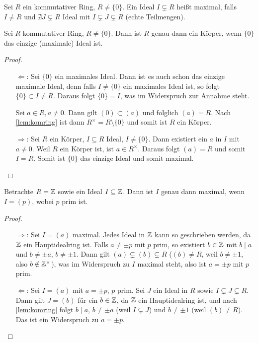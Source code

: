 \documentclass[12pt,a4paper]{scrartcl}
\begin{document}
\begin{defi}
	Sei $R$ ein kommutativer Ring, $R\neq \{0\}$. Ein Ideal $I\subsetneq R$ heißt maximal, falls $I\neq R$ und $\nexists J\subsetneq R$ Ideal mit $I\subsetneq J\subsetneq R$ (echte Teilmengen).
\end{defi}
\begin{lem} \label{lem:field_0_max_ideal}
	Sei $R$ kommutativer Ring, $R\neq \{0\}$. Dann ist $R$ genau dann ein Körper, wenn $\lbrace 0 \rbrace$ das einzige (maximale) Ideal ist.
\end{lem}
\begin{proof}
	\leavevmode
	\begin{itemize}
		\item[\glqq $\Leftarrow$\grqq:] Sei $\{0\}$ ein maximales Ideal. Dann ist es auch schon das einzige maximale Ideal, denn falls $I\neq \{0\}$ ein maximales Ideal ist, so folgt $\{0\}\subset I\neq R$. Daraus folgt $\{0\} = I$, was im Widerspruch zur Annahme steht.
		
		Sei $a\in R, a\neq 0$. Dann gilt $(0) \subset (a)$ und folglich $(a) = R$. Nach \cref{lem:komring} ist dann $R^{\times} = R\setminus\{0\}$ und somit ist $R$ ein Körper.
		\item[\glqq $\Rightarrow$\grqq:] Sei $R$ ein Körper, $I\subseteq R$ Ideal, $I\neq \{0\}$. Dann existiert ein $a$ in $I$ mit $ a\neq 0$. Weil $R$ ein Körper ist, ist $a\in R^{\times}$. Daraus folgt $(a) = R$ und somit $I = R$. Somit ist $\{0\}$ das einzige Ideal und somit maximal.
	\end{itemize}
\end{proof}

\begin{bsp} \label{bsp:IZ_max_ideal_klas}
	Betrachte $R = \mathbb Z$ sowie ein Ideal $I\subseteq \mathbb Z$. Dann ist $I$ genau dann maximal, wenn $I = (p)$, wobei $p$ prim ist.
	\begin{proof}
		\leavevmode
		\begin{itemize}
			\item[\glqq $\Rightarrow$\grqq:] Sei $I = (a)$ maximal. Jedes Ideal in $\mathbb Z$ kann so geschrieben werden, da $\mathbb Z$ ein Hauptidealring ist. Falls $a\neq \pm p$ mit $p$ prim, so existiert $b\in \mathbb Z$ mit $b\mid a$ und $b\neq \pm a$, $b\neq  \pm 1$.
			Dann gilt $(a)\subsetneq (b)\subsetneq R$ ($(b)\neq R$, weil $b\neq \pm 1$, also $b\notin \mathbb Z^{\times}$), was im Widerspruch zu $I$ maximal steht, also ist $a  = \pm p$ mit $p$ prim.
			
			\item[\glqq $\Leftarrow$\grqq:] Sei $I = (a)$ mit $a = \pm p$, $p$ prim. Sei $J$ ein Ideal in $R$ sowie $I \subsetneq J\subsetneq R$. Dann gilt $J = (b)$ für ein $b\in\mathbb Z$, da $\mathbb Z$ ein Hauptidealring ist, und nach \cref{lem:komring} folgt $b\mid a$, $b\neq \pm a$ (weil $I\subsetneq J$) und $b \neq \pm 1$ (weil $(b)\neq R$). Das ist ein Widerspruch zu $a = \pm p$.
		\end{itemize}
	\end{proof}
\end{bsp}
\end{document}
